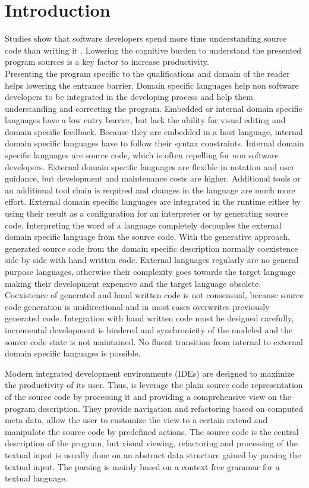 \chapter{Introduction}
\label{cha:introduction}
Studies show that software developers spend more time understanding source code than writing it \cite{uistudy}. Lowering the cognitive burden to understand the presented program sources is a key factor to increase productivity. \\

Presenting the program specific to the qualifications and domain of the reader helps lowering the entrance barrier. Domain specific languages help non software developers to be integrated in the developing process and help them understanding and correcting the program. Embedded or internal domain specific languages have a low entry barrier, but lack the ability for visual editing and domain specific feedback. Because they are embedded in a host language, internal domain specific languages have to follow their syntax constraints. Internal domain specific languages are source code, which is often repelling for non software developers. External domain specific languages are flexible in notation and user guidance, but development and maintenance costs are higher. Additional tools or an additional tool chain is required and changes in the language are much more effort. External domain specific languages are integrated in the runtime either by using their result as a configuration for an interpreter or by generating source code. Interpreting the word of a language completely decouples the external domain specific language from the source code. With the generative approach, generated source code from the domain specific description normally coexistence side by side with hand written code. External languages regularly are no general purpose languages, otherwise their complexity goes towards the target language making their development expensive and the target language obsolete. Coexistence of generated and hand written code is not consensual, because source code generation is unidirectional and in most cases overwrites previously generated code. Integration with hand written code must be designed carefully, incremental development is hindered and synchronicity of the modeled and the source code state is not maintained. No fluent transition from internal to external domain specific languages is possible.   

Modern integrated development environments (IDEs) are designed to maximize the productivity of its user. Thus, is leverage the plain source code representation of the source code by processing it and providing a comprehensive view on the program description. They provide navigation and refactoring based on computed meta data, allow the user to customize the view to a certain extend and manipulate the source code by predefined actions. The source code is the central description of the program, but visual viewing, refactoring and processing of the textual input is usually done on an abstract data structure gained by parsing the textual input. The parsing is mainly based on a context free grammar for a textual language. 

